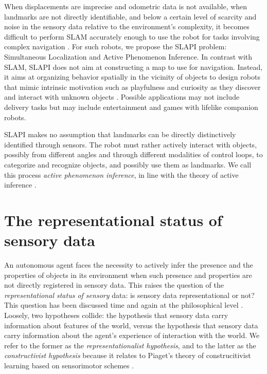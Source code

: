 \documentclass[pmlr]{jmlr}%
\begin{document}
When displacements are imprecise and odometric data is not available, when landmarks are not directly identifiable, and below a certain level of scarcity and noise in the sensory data relative to the environment’s complexity, it becomes difficult to perform SLAM accurately enough to use the robot for tasks involving complex navigation \citep{gay_towards_2021}. 
For such robots, we propose the SLAPI problem:  Simultaneous Localization and Active Phenomenon Inference.
In contrast with SLAM, SLAPI does not aim at constructing a map to use for navigation. 
Instead, it aims at organizing behavior spatially in the vicinity of objects to design robots that mimic intrinsic motivation such as playfulness and curiosity as they discover and interact with unknown objects \citep[e.g.,][]{oudeyer_intrinsic_2007}. 
Possible applications may not include delivery tasks but may include entertainment and games with lifelike companion robots. 

SLAPI makes no assumption that landmarks can be directly distinctively identified through sensors. 
The robot must rather actively interact with objects, possibly from different angles and through different modalities of control loops, to categorize and recognize objects, and possibly use them as landmarks. 
We call this process \textit{active phenomenon inference}, in line with the theory of active inference \cite[e.g.,][]{friston_world_2021}. 


\section{The representational status of sensory data}
\label{sec:input}

An autonomous agent faces the necessity to actively infer the presence and the properties of objects in its environment when such presence and properties are not directly registered in sensory data. 
This raises the question of the \textit{representational status of sensory} data: is sensory data representational or not? 
This question has been discussed time and again at the philosophical level \citep[e.g.,][]{williford_husserls_2013}.
Loosely, two hypotheses collide: the hypothesis that sensory data carry information about features of the world, versus the hypothesis that sensory data carry information about the agent's experience of interaction with the world. 
We refer to the former as the \textit{representationalist hypothesis}, and to the latter as the \textit{constructivist hypothesis} because it relates to Piaget's theory of construcitivist learning based on sensorimotor schemes \citep{guillermin_artificial_2022}. 
\end{document}
